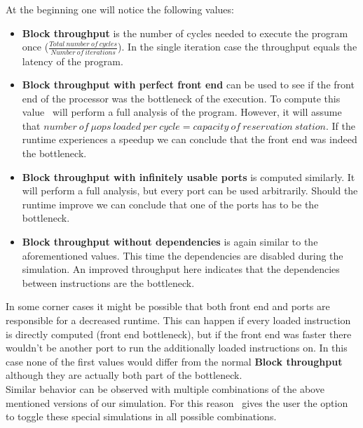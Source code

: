 At the beginning one will notice the following values:
\begin{itemize}
    \item \textbf{Block throughput} is the number of cycles needed to execute the program once ($\frac{Total\ number\ of\ cycles}{Number\ of\ iterations}$). In the single iteration case the throughput equals the latency of the program.
    \item \textbf{Block throughput with perfect front end} can be used to see if the front end of the processor was the bottleneck of the execution. To compute this value \suaca\ will perform a full analysis of the program. However, it will assume that $number\ of\ \mu ops\ loaded\ per\ cycle = capacity\ of\ reservation\ station$. If the runtime experiences a speedup we can conclude that the front end was indeed the bottleneck.
    \item \textbf{Block throughput with infinitely usable ports} is computed similarly. It will perform a full analysis, but every port can be used arbitrarily. Should the runtime improve we can conclude that one of the ports has to be the bottleneck.
    \item \textbf{Block throughput without dependencies} is again similar to the aforementioned values. This time the dependencies are disabled during the simulation. An improved throughput here indicates that the dependencies between instructions are the bottleneck. 
\end{itemize}

In some corner cases it might be possible that both front end and ports are responsible for a decreased runtime. This can happen if every loaded instruction is directly computed (front end bottleneck), but if the front end was faster there wouldn't be another port to run the additionally loaded instructions on. In this case none of the first values would differ from the normal \textbf{Block throughput} although they are actually both part of the bottleneck.\\
Similar behavior can be observed with multiple combinations of the above mentioned versions of our simulation. For this reason \suaca\ gives the user the option to toggle these special simulations in all possible combinations.\\


